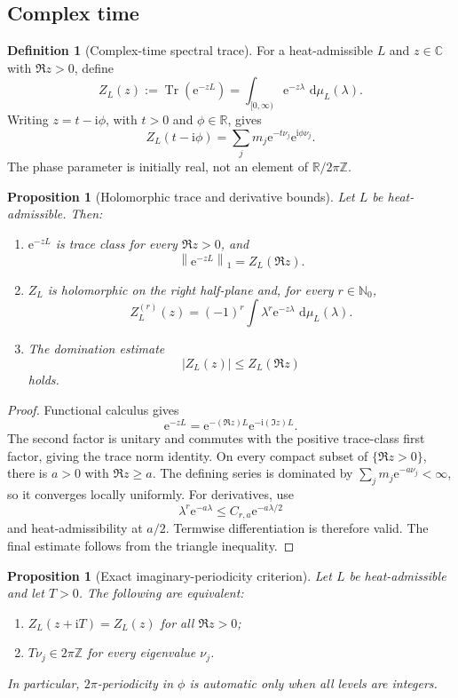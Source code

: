 \documentclass[11pt,a4paper]{article}
\newtheorem{proposition}[theorem]{Proposition}
\theoremstyle{definition}
\newtheorem{definition}[theorem]{Definition}
\theoremstyle{remark}
\newcommand{\R}{\mathbb R}
\newcommand{\C}{\mathbb C}
\newcommand{\Z}{\mathbb Z}
\newcommand{\N}{\mathbb N}
\newcommand{\Tr}{\operatorname{Tr}}
\newcommand{\e}{\mathrm e}
\newcommand{\ii}{\mathrm i}
\newcommand{\dd}{\,\mathrm d}
\newcommand{\norm}[1]{\left\lVert #1\right\rVert}
\newcommand{\abs}[1]{\left\lvert #1\right\rvert}
\begin{document}
\subsection{Complex time}

\begin{definition}[Complex-time spectral trace]
For a heat-admissible \(L\) and \(z\in\C\) with \(\Re z>0\), define
\[
  Z_L(z):=\Tr(\e^{-zL})
  =\int_{[0,\infty)}\e^{-z\lambda}\,\dd\mu_L(\lambda).
\]
Writing \(z=t-\ii\phi\), with \(t>0\) and \(\phi\in\R\), gives
\[
  Z_L(t-\ii\phi)
  =\sum_jm_j\e^{-t\nu_j}\e^{\ii\phi\nu_j}.
\]
The phase parameter is initially real, not an element of
\(\R/2\pi\Z\).
\end{definition}

\begin{proposition}[Holomorphic trace and derivative bounds]
\label{prop:holomorphic}
Let \(L\) be heat-admissible. Then:
\begin{enumerate}
\item \(\e^{-zL}\) is trace class for every \(\Re z>0\), and
      \[
        \norm{\e^{-zL}}_1=Z_L(\Re z).
      \]
\item \(Z_L\) is holomorphic on the right half-plane and, for every
      \(r\in\N_0\),
      \[
        Z_L^{(r)}(z)
        =(-1)^r\int\lambda^r\e^{-z\lambda}\,\dd\mu_L(\lambda).
      \]
\item The domination estimate
      \[
        \abs{Z_L(z)}\leq Z_L(\Re z)
      \]
      holds.
\end{enumerate}
\end{proposition}

\begin{proof}
Functional calculus gives
\[
 \e^{-zL}=\e^{-(\Re z)L}\e^{-\ii(\Im z)L}.
\]
The second factor is unitary and commutes with the positive trace-class first
factor, giving the trace norm identity. On every compact subset of
\(\{\Re z>0\}\), there is \(a>0\) with \(\Re z\geq a\). The defining series is
dominated by \(\sum_jm_j\e^{-a\nu_j}<\infty\), so it converges locally uniformly.
For derivatives, use
\[
 \lambda^r\e^{-a\lambda}
 \leq C_{r,a}\e^{-a\lambda/2}
\]
and heat-admissibility at \(a/2\). Termwise differentiation is therefore
valid. The final estimate follows from the triangle inequality.
\end{proof}

\begin{proposition}[Exact imaginary-periodicity criterion]
\label{prop:periodicity}
Let \(L\) be heat-admissible and let \(T>0\). The following are equivalent:
\begin{enumerate}
\item \(Z_L(z+\ii T)=Z_L(z)\) for all \(\Re z>0\);
\item \(T\nu_j\in2\pi\Z\) for every eigenvalue \(\nu_j\).
\end{enumerate}
In particular, \(2\pi\)-periodicity in \(\phi\) is automatic only when all
levels are integers.
\end{proposition}
\end{document}
